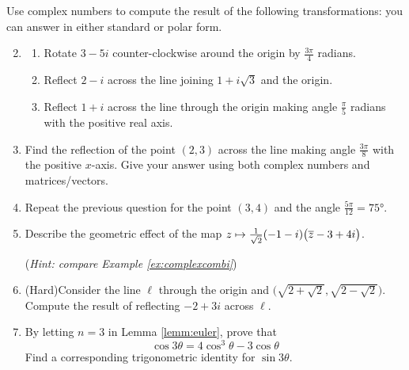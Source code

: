 \begin{exercises}
	\exstart Use complex numbers to compute the result of the following transformations: you can answer in either standard or polar form.
	\begin{enumerate}\setcounter{enumi}{1}
	  \item[]\begin{enumerate}
	    \item Rotate $3-5i$ counter-clockwise around the origin by $\frac{3\pi}4$ radians.
	    \item Reflect $2-i$ across the line joining $1+i\sqrt 3$ and the origin.
	    \item Reflect $1+i$ across the line through the origin making angle $\frac\pi 5$ radians with the positive real axis.
	  \end{enumerate}
	  
	  
	  
	  \item Find the reflection of the point $(2,3)$ across the line making angle $\frac{3\pi}8$ with the positive $x$-axis. Give your answer using both complex numbers and matrices/vectors.
	  
	  
		\item Repeat the previous question for the point $(3,4)$ and the angle $\frac{5\pi}{12}=\ang{75}$.
	  
	  
	  \item Describe the geometric effect of the map $z\mapsto \frac 1{\sqrt 2}(-1-i)\bigl(\overline{z}-3+4i\bigr)$.\par
	  (\emph{Hint: compare Example \ref{ex:complexcombi}})
	  
	  
	  \item (Hard)\lstsp Consider the line $\ell$ through the origin and $\bigl(\sqrt{2+\sqrt 2},\sqrt{2-\sqrt 2}\bigr)$. Compute the result of reflecting $-2+3i$ across $\ell$.
	    
	      
	  \item By letting $n=3$ in Lemma \ref{lemm:euler}, prove that 
	  	\[\cos 3\theta=4\cos^3\!\theta-3\cos\theta\]
	  	Find a corresponding trigonometric identity for $\sin 3\theta$.
	  	

\end{enumerate}
\end{exercises}
